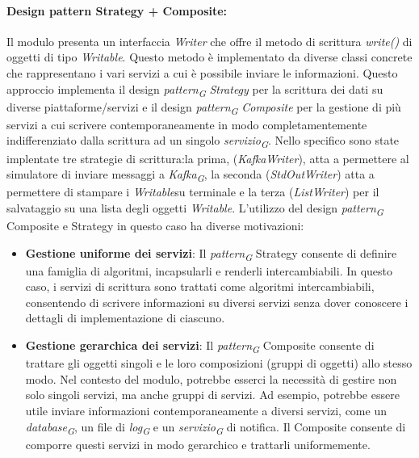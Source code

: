 \paragraph{Design pattern Strategy + Composite:}
Il modulo presenta un interfaccia \textit{Writer} che offre il metodo di scrittura \textit{write()} di oggetti di tipo \textit{Writable}.
Questo metodo è implementato da diverse classi concrete che rappresentano i vari servizi a cui è possibile inviare le informazioni.
Questo approccio implementa il design \textit{pattern}\textsubscript{\textit{G}} \textit{Strategy} per la scrittura dei dati su diverse piattaforme/servizi e il design \textit{pattern}\textsubscript{\textit{G}} \textit{Composite} per la gestione di più servizi a cui scrivere contemporaneamente in modo completamentemente indifferenziato dalla scrittura ad un singolo \textit{servizio}\textsubscript{\textit{G}}.
Nello specifico sono state implentate tre strategie di scrittura:la prima, (\textit{KafkaWriter}), atta a permettere al simulatore di inviare messaggi a \textit{Kafka}\textsubscript{\textit{G}},  la seconda (\textit{StdOutWriter}) atta a permettere di stampare i \textit{Writable}su terminale e la terza (\textit{ListWriter}) per il salvataggio su una lista degli oggetti \textit{Writable}.
L'utilizzo del design \textit{pattern}\textsubscript{\textit{G}} Composite e Strategy in questo caso ha diverse motivazioni:
\begin{itemize}
    \item \textbf{Gestione uniforme dei servizi}: Il \textit{pattern}\textsubscript{\textit{G}} Strategy consente di definire una famiglia di algoritmi, incapsularli e renderli intercambiabili. In questo caso, i servizi di scrittura sono trattati come algoritmi intercambiabili, consentendo di scrivere informazioni su diversi servizi senza dover conoscere i dettagli di implementazione di ciascuno.
    \item \textbf{Gestione gerarchica dei servizi}: Il \textit{pattern}\textsubscript{\textit{G}} Composite consente di trattare gli oggetti singoli e le loro composizioni (gruppi di oggetti) allo stesso modo. Nel contesto del modulo, potrebbe esserci la necessità di gestire non solo singoli servizi, ma anche gruppi di servizi. Ad esempio, potrebbe essere utile inviare informazioni contemporaneamente a diversi servizi, come un \textit{database}\textsubscript{\textit{G}}, un file di \textit{log}\textsubscript{\textit{G}} e un \textit{servizio}\textsubscript{\textit{G}} di notifica. Il Composite consente di comporre questi servizi in modo gerarchico e trattarli uniformemente.
\end{itemize}

